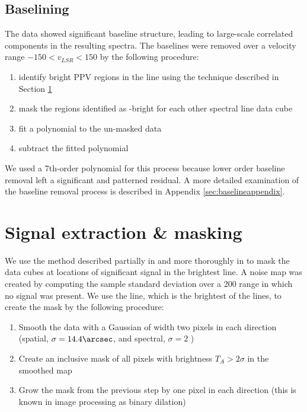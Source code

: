 

\subsection{Baselining}
\label{sec:baseline}
The data showed significant baseline structure, leading to large-scale
correlated components in the resulting spectra.  The baselines were removed
over a velocity range $-150 < v_{LSR} < 150$ \kms by the
following procedure:
\begin{enumerate}
    \item identify bright PPV regions in the \para \threeohthree line using the
        technique described in Section \ref{sec:signal}
    \item mask the regions identified as \threeohthree-bright for each other 
        spectral line data cube
    \item fit a polynomial to the un-masked data
    \item subtract the fitted polynomial
\end{enumerate}
We used a 7th-order polynomial for this process because lower order baseline
removal left a significant and patterned residual.  A more detailed examination
of the baseline removal process is described in Appendix
\ref{sec:baselineappendix}.

\section{Signal extraction \& masking}
\label{sec:signal}
We use the method described partially in \citet{Ao2013a} and more thoroughly in
\citet{Dame2011b} to mask the data cubes at locations of significant signal in 
the brightest line. 
A noise map was created by computing the sample standard deviation over a
200 \kms range in which no signal was present.
We use the \para \threeohthree line, which is the brightest of the
\formaldehyde lines, to create the mask by
the following procedure:

\begin{enumerate}
    \item Smooth the data with a Gaussian of width two pixels in each direction
        (spatial, $\sigma=14.4\arcsec$, and spectral, $\sigma=2$ \kms)
    \item Create an inclusive mask of all pixels with brightness $T_A >
        2\sigma$ in the smoothed map
    \item Grow the mask from the previous step by one pixel in each direction
        (this is known in image processing as binary dilation)
\end{enumerate}

